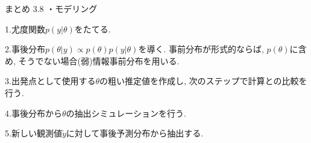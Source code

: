 \documentclass[10pt,dvipdfmx,a4]{beamer}
\begin{document}

\begin{frame}{まとめ 3.8}
・モデリング

1.尤度関数$p(y|\theta)$をたてる.

2.事後分布$p(\theta|y)\propto p(\theta)p(y|\theta)$を導く.
事前分布が形式的ならば, $p(\theta)$に含め, そうでない場合(弱)情報事前分布を用いる.

3.出発点として使用する$\theta$の粗い推定値を作成し, 次のステップで計算との比較を行う.

4.事後分布から$\theta$の抽出シミュレーションを行う.

5.新しい観測値$\tilde{y}$に対して事後予測分布から抽出する.
\end{frame}

\end{document}
